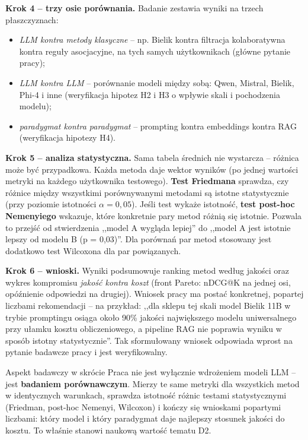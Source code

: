\documentclass[12pt,a4paper]{article}
\begin{document}
\textbf{Krok 4 -- trzy osie porównania.} Badanie zestawia wyniki na trzech płaszczyznach:
\begin{itemize}
\item \emph{LLM kontra metody klasyczne} -- np. Bielik kontra filtracja kolaboratywna kontra reguły asocjacyjne, na tych samych użytkownikach (główne pytanie pracy);
\item \emph{LLM kontra LLM} -- porównanie modeli między sobą: Qwen, Mistral, Bielik, Phi-4 i inne (weryfikacja hipotez H2 i H3 o wpływie skali i pochodzenia modelu);
\item \emph{paradygmat kontra paradygmat} -- prompting kontra embeddings kontra RAG (weryfikacja hipotezy H4).
\end{itemize}

\textbf{Krok 5 -- analiza statystyczna.} Sama tabela średnich nie wystarcza -- różnica może być przypadkowa. Każda metoda daje wektor wyników (po jednej wartości metryki na każdego użytkownika testowego). \textbf{Test Friedmana} sprawdza, czy różnice między wszystkimi porównywanymi metodami są istotne statystycznie (przy poziomie istotności $\alpha = 0{,}05$). Jeśli test wykaże istotność, \textbf{test post-hoc Nemenyiego} wskazuje, które konkretnie pary metod różnią się istotnie. Pozwala to przejść od stwierdzenia ,,model A wygląda lepiej'' do ,,model A jest istotnie lepszy od modelu B (p = 0{,}03)''. Dla porównań par metod stosowany jest dodatkowo test Wilcoxona dla par powiązanych.

\textbf{Krok 6 -- wnioski.} Wyniki podsumowuje ranking metod według jakości oraz wykres kompromisu \emph{jakość kontra koszt} (front Pareto: nDCG@K na jednej osi, opóźnienie odpowiedzi na drugiej). Wniosek pracy ma postać konkretnej, popartej liczbami rekomendacji -- na przykład: ,,dla sklepu tej skali model Bielik 11B w trybie promptingu osiąga około 90\% jakości największego modelu uniwersalnego przy ułamku kosztu obliczeniowego, a pipeline RAG nie poprawia wyniku w sposób istotny statystycznie''. Tak sformułowany wniosek odpowiada wprost na pytanie badawcze pracy i jest weryfikowalny.

\begin{infobox}{Aspekt badawczy w skrócie}
Praca nie jest wyłącznie wdrożeniem modeli LLM -- jest \textbf{badaniem porównawczym}. Mierzy te same metryki dla wszystkich metod w identycznych warunkach, sprawdza istotność różnic testami statystycznymi (Friedman, post-hoc Nemenyi, Wilcoxon) i kończy się wnioskami popartymi liczbami: który model i który paradygmat daje najlepszy stosunek jakości do kosztu. To właśnie stanowi naukową wartość tematu D2.
\end{infobox}
\end{document}
